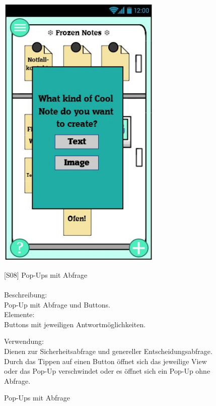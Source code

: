 \documentclass[a4paper]{scrreprt}
\begin{document}
    	\begin{figure}[h!]
    		\begin{minipage}[t]{0.4\linewidth}
    			\flushright
    			\centering
    			\vspace{9mm}
    			\includegraphics[width=0.7\textwidth]{fridget_type.JPG}
    			\caption{Pop-Ups mit Abfrage}
    			\label{fig:figure1}
    		\end{minipage}
    		\hspace{0.5cm}
    		\begin{minipage}[t]{0.55\linewidth}
    			\flushleft
    			\vspace{9mm}
    			{[}S08{]} Pop-Ups mit Abfrage \\
    			\hfill
    			\\
    			Beschreibung: \\
    			Pop-Up mit Abfrage und Buttons. 
    			\\
    			Elemente:\\
    			Buttons mit jeweiligen Antwortmöglichkeiten.\\
    			
    			\hfill 
    			
    			Verwendung:\\
    			 Dienen zur Sicherheitsabfrage und genereller 
    			Entscheidungsabfrage.\\ Durch das Tippen auf
    			einen Button öffnet sich das jeweilige View oder
    			das Pop-Up verschwindet oder es öffnet sich ein
    			Pop-Up ohne Abfrage.
    			 
    			
    			
    			
    		\end{minipage}
    	\end{figure}
    	
\end{document}
